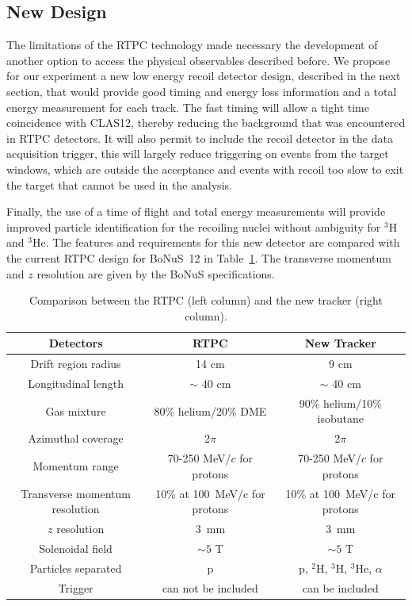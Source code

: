 \subsection{New Design}
The limitations of the RTPC technology made necessary the development of another option to access the physical observables described before. We propose for our experiment a new low energy recoil detector design, described in the next section, that would provide good timing and energy loss information and a total energy measurement for each track. The fast timing will allow a tight time coincidence with CLAS12, thereby reducing the background that was encountered in RTPC detectors. It will also permit to include the recoil detector in the data acquisition trigger, this will largely reduce triggering on events from the target windows, which are outside the acceptance and events with recoil too slow to exit the target that cannot be used in the analysis. 

Finally, the use of a time of flight and total energy measurements will provide improved particle identification for the recoiling nuclei without ambiguity for $^3$H and $^3$He. The features and requirements for this new detector are compared with the current RTPC design for BoNuS~12 in Table~\ref{tab:comp}. The transverse momentum and $z$ resolution are given by the BoNuS specifications.

\begin{table}[ht!]
\caption{\label{tab:comp}Comparison between the RTPC (left column) and the new tracker (right column).}
\begin{tabular}{|c|c|c|}
\hline
\textbf{Detectors}  & \textbf{RTPC}        & \textbf{New Tracker}\\
\hline
Drift region radius & 14 cm                & 9 cm\\
\hline
Longitudinal length & $\sim$ 40 cm         & $\sim$ 40 cm \\
\hline
Gas mixture         & 80\% helium/20\% DME & 90\% helium/10\% isobutane \\
\hline
Azimuthal coverage  & 2$\pi$               & 2$\pi$\\
\hline
Momentum range      & 70-250 MeV/$c$ for protons & 70-250 MeV/$c$ for protons\\
\hline
Transverse momentum resolution & 10\% at 100~MeV/c for protons & 10\% at 100~MeV/c for protons\\
\hline
$z$ resolution & 3~mm & 3~mm \\
\hline
Solenoidal field    & $\sim 5$ T           & $\sim 5$ T \\
\hline
Particles separated & p                    & p, $^2$H, $^3$H, $^3$He, $\alpha$ \\
\hline
Trigger             & can not be included  & can be included \\
\hline
\end{tabular}
\end{table}

